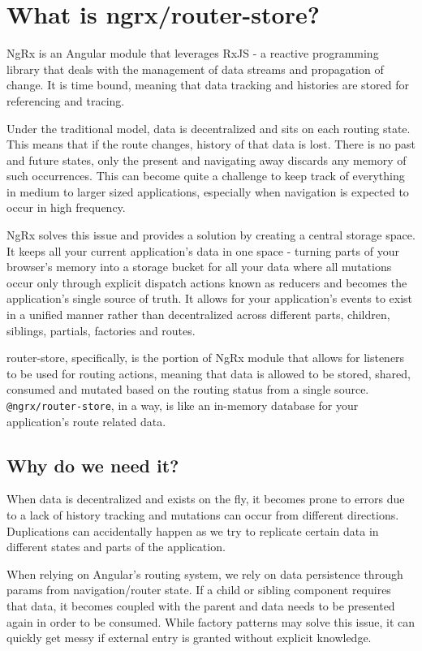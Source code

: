 
\chapter{ What is ngrx/router-store? }

NgRx is an Angular module that leverages RxJS -  a reactive programming library
that deals with the management of data streams and propagation of change. It is
time bound, meaning that data tracking and histories are stored for referencing
and tracing.

Under the traditional model, data is decentralized and sits on each routing
state. This means that if the route changes, history of that data is lost. There
is no past and future states, only the present and navigating away discards any
memory of such occurrences. This can become quite a challenge to keep track of
everything in medium to larger sized applications, especially when navigation
is expected to occur in high frequency.

NgRx solves this issue and provides a solution by creating a central storage
space. It keeps all your current application's data in one space - turning parts
of your browser's memory into a  storage bucket for all your data where all
mutations occur only through explicit dispatch actions known as reducers and
becomes the application's single source of truth. It allows for your
application's events to exist in a unified manner rather than decentralized
across different parts, children, siblings, partials, factories and routes.

router-store, specifically, is the portion of NgRx module that allows for
listeners to be used for routing actions, meaning that data is allowed to be
stored, shared, consumed and mutated based on the routing status from
a single source. \texttt{@ngrx/router-store}, in a way, is like an in-memory database
for your application's route related data.

\section{Why do we need it?}
When data is decentralized and exists on the fly, it becomes prone to errors due
to a lack of history tracking and mutations can occur from different directions.
Duplications can accidentally happen as we try to replicate certain data in
different states and parts of the application.

When relying on Angular's routing system, we rely on data persistence through
params from navigation/router state. If a child or sibling component requires
that data, it becomes coupled with the parent and data needs to be presented
again in order to be consumed. While factory patterns may solve this issue, it
can quickly get messy if external entry is granted without explicit knowledge.


